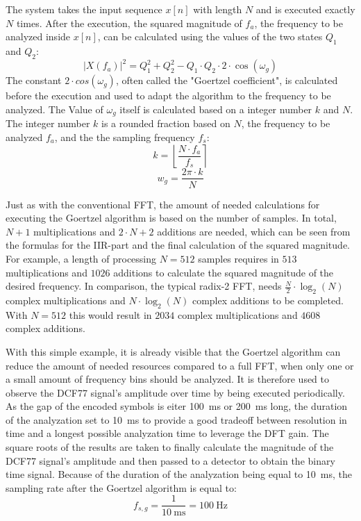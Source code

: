 \documentclass[conference]{IEEEtran}
\begin{document}
\FloatBarrier\noindent
The system takes the input sequence $x[n]$ with length $N$ and is executed exactly $N$ times.
After the execution, the squared magnitude of $f_{a}$, the frequency to be analyzed inside $x[n]$, can be calculated using the values of the two states $Q_{1}$ and $Q_{2}$:
\begin{equation}
    |X(f_{a})|^2 = Q_{1}^2 + Q_{2}^2 - Q_{1} \cdot Q_{2} \cdot 2 \cdot \cos(\omega_{g})
\end{equation}
The constant $2 \cdot cos(\omega_{g})$, often called the "Goertzel coefficient", is calculated before the execution and used to adapt the algorithm to the frequency to be analyzed.
The Value of $\omega_{g}$ itself is calculated based on a integer number $k$ and $N$.
The integer number $k$ is a rounded fraction based on $N$, the frequency to be analyzed $f_{a}$, and the the sampling frequency $f_{s}$:
\begin{equation}
    k = \left\lfloor \frac{N \cdot f_{a}}{f_{s}} \right\rceil
\end{equation}
\begin{equation}
    w_g = \frac{2\pi \cdot k}{N}
\end{equation}

\par
Just as with the conventional FFT, the amount of needed calculations for executing the Goertzel algorithm is based on the number of samples.
In total, $N + 1$ multiplications and $2 \cdot N + 2$ additions are needed, which can be seen from the formulas for the IIR-part and the final calculation of the squared magnitude.
For example, a length of processing $N = 512$ samples requires in $513$ multiplications and $1026$ additions to calculate the squared magnitude of the desired frequency.
In comparison, the typical radix-2 FFT, needs $\frac{N}{2} \cdot \log_{2}(N)$ complex multiplications and $N \cdot \log_{2}(N)$ complex additions to be completed. With $N = 512$ this would result in $2034$ complex multiplications and $4608$ complex additions.
\par
With this simple example, it is already visible that the Goertzel algorithm can reduce the amount of needed resources compared to a full FFT, when only one or a small amount of frequency bins should be analyzed.
It is therefore used to observe the DCF77 signal's amplitude over time by being executed periodically.
As the gap of the encoded symbols is eiter \SI{100}{\milli\second} or \SI{200}{\milli\second} long, the duration of the analyzation set to \SI{10}{\milli\second} to provide a good tradeoff between resolution in time and a longest possible analyzation time
to leverage the DFT gain.
The square roots of the results are taken to finally calculate the magnitude of the DCF77 signal's amplitude and then passed to a detector to obtain the binary time signal.
Because of the duration of the analyzation being equal to \SI{10}{\milli\second}, the sampling rate after the Goertzel algorithm is equal to:
\begin{equation}
    f_{s,g} = \frac{1}{\SI{10}{\milli\second}} = \SI{100}{\hertz}
\end{equation}
\end{document}
